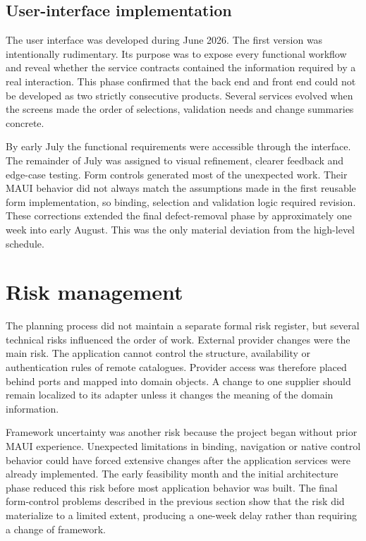 \subsection{User-interface implementation}

The user interface was developed during June 2026. The first version was intentionally rudimentary. Its purpose was to expose every functional workflow and reveal whether the service contracts contained the information required by a real interaction. This phase confirmed that the back end and front end could not be developed as two strictly consecutive products. Several services evolved when the screens made the order of selections, validation needs and change summaries concrete.

By early July the functional requirements were accessible through the interface. The remainder of July was assigned to visual refinement, clearer feedback and edge-case testing. Form controls generated most of the unexpected work. Their MAUI behavior did not always match the assumptions made in the first reusable form implementation, so binding, selection and validation logic required revision. These corrections extended the final defect-removal phase by approximately one week into early August. This was the only material deviation from the high-level schedule.

\section{Risk management}

The planning process did not maintain a separate formal risk register, but several technical risks influenced the order of work. External provider changes were the main risk. The application cannot control the structure, availability or authentication rules of remote catalogues. Provider access was therefore placed behind ports and mapped into domain objects. A change to one supplier should remain localized to its adapter unless it changes the meaning of the domain information.

Framework uncertainty was another risk because the project began without prior MAUI experience. Unexpected limitations in binding, navigation or native control behavior could have forced extensive changes after the application services were already implemented. The early feasibility month and the initial architecture phase reduced this risk before most application behavior was built. The final form-control problems described in the previous section show that the risk did materialize to a limited extent, producing a one-week delay rather than requiring a change of framework.

